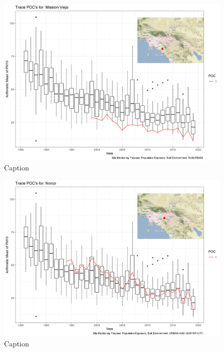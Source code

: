 \begin{figure}
    \centering
    \includegraphics[width = \textwidth]{Figures/IndividualSiteTraces/TracePOC_Mission Viejo.png}
    \caption{Caption}
    \label{fig:my_label}
\end{figure}

\begin{figure}
    \centering
    \includegraphics[width = \textwidth]{Figures/IndividualSiteTraces/TracePOC_Norco.png}
    \caption{Caption}
    \label{fig:my_label}
\end{figure}

